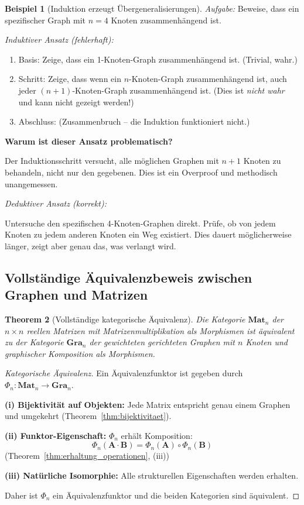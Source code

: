 \documentclass[12pt, a4paper]{article}
\newtheorem{theorem}{Theorem}[section]
\theoremstyle{definition}
\newtheorem{example}[theorem]{Beispiel}
\theoremstyle{remark}
\newcommand{\vA}{\bm{A}}
\newcommand{\vB}{\bm{B}}
\begin{document}
\begin{example}[Induktion erzeugt Übergeneral­isierungen]
\label{ex:anhang_induktion_probleme}
\emph{Aufgabe:} Beweise, dass ein spezifischer Graph mit $n=4$ Knoten zusammenhängend ist.

\emph{Induktiver Ansatz (fehlerhaft):}
\begin{enumerate}[label=(\roman*)]
  \item Basis: Zeige, dass ein 1-Knoten-Graph zusammenhängend ist. (Trivial, wahr.)
  
  \item Schritt: Zeige, dass wenn ein $n$-Knoten-Graph zusammenhängend ist, auch jeder $(n+1)$-Knoten-Graph zusammenhängend ist. (Dies ist \emph{nicht wahr} und kann nicht gezeigt werden!)
  
  \item Abschluss: (Zusammenbruch -- die Induktion funktioniert nicht.)
\end{enumerate}

\textbf{Warum ist dieser Ansatz problematisch?}

Der Induktionsschritt versucht, alle möglichen Graphen mit $n+1$ Knoten zu behandeln, nicht nur den gegebenen. Dies ist ein Overproof und methodisch unangemessen.

\emph{Deduktiver Ansatz (korrekt):}

Untersuche den spezifischen 4-Knoten-Graphen direkt. Prüfe, ob von jedem Knoten zu jedem anderen Knoten ein Weg existiert. Dies dauert möglicherweise länger, zeigt aber genau das, was verlangt wird.
\end{example}

\subsection{Vollständige Äquivalenzbeweis zwischen Graphen und Matrizen}
\label{subsec:anhang_vollständige_aequivalenz}

\begin{theorem}[Vollständige kategorische Äquivalenz]
\label{thm:anhang_kategorische_aequivalenz}
Die Kategorie $\mathbf{Mat}_n$ der $n \times n$ reellen Matrizen mit Matrizenmultiplikation als Morphismen ist äquivalent zu der Kategorie $\mathbf{Gra}_n$ der gewichteten gerichteten Graphen mit $n$ Knoten und graphischer Komposition als Morphismen.
\end{theorem}

\begin{proof}[Kategorische Äquivalenz]
Ein Äquivalenzfunktor ist gegeben durch $\Phi_n: \mathbf{Mat}_n \to \mathbf{Gra}_n$.

\textbf{(i) Bijektivität auf Objekten:} Jede Matrix entspricht genau einem Graphen und umgekehrt (Theorem~\ref{thm:bijektivitaet}).

\textbf{(ii) Funktor-Eigenschaft:} $\Phi_n$ erhält Komposition:
\[
  \Phi_n(\vA \cdot \vB) = \Phi_n(\vA) \circ \Phi_n(\vB)
\]
(Theorem~\ref{thm:erhaltung_operationen}, (iii))

\textbf{(iii) Natürliche Isomorphie:} Alle strukturellen Eigenschaften werden erhalten.

Daher ist $\Phi_n$ ein Äquivalenzfunktor und die beiden Kategorien sind äquivalent.
\end{proof}
\end{document}
